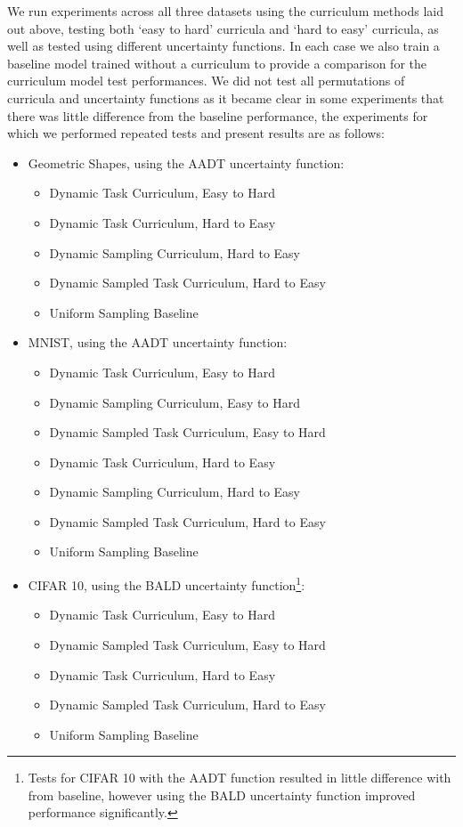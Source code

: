 We run experiments across all three datasets using the curriculum methods laid out above, testing both `easy to hard' curricula and `hard to easy' curricula, as well as tested using different uncertainty functions. In each case we also train a baseline model trained without a curriculum to provide a comparison for the curriculum model test performances. We did not test all permutations of curricula and uncertainty functions as it became clear in some experiments that there was little difference from the baseline performance, the experiments for which we performed repeated tests and present results are as follows:
\begin{itemize}
\item Geometric Shapes, using the AADT uncertainty function:
\begin{itemize}
\item{Dynamic Task Curriculum, Easy to Hard}
\item{Dynamic Task Curriculum, Hard to Easy}
\item{Dynamic Sampling Curriculum, Hard to Easy}
\item{Dynamic Sampled Task Curriculum, Hard to Easy}
\item{Uniform Sampling Baseline}
\end{itemize}
\item MNIST, using the AADT uncertainty function:
\begin{itemize}
\item{Dynamic Task Curriculum, Easy to Hard}
\item{Dynamic Sampling Curriculum, Easy to Hard}
\item{Dynamic Sampled Task Curriculum, Easy to Hard}
\item{Dynamic Task Curriculum, Hard to Easy}
\item{Dynamic Sampling Curriculum, Hard to Easy}
\item{Dynamic Sampled Task Curriculum, Hard to Easy}
\item{Uniform Sampling Baseline}
\end{itemize}
\item CIFAR 10, using the BALD uncertainty function\footnote {Tests for CIFAR 10 with the AADT function resulted in little difference with from baseline, however using the BALD uncertainty function improved performance significantly.}:
\begin{itemize}
\item{Dynamic Task Curriculum, Easy to Hard}
\item{Dynamic Sampled Task Curriculum, Easy to Hard}
\item{Dynamic Task Curriculum, Hard to Easy}
\item{Dynamic Sampled Task Curriculum, Hard to Easy}
\item{Uniform Sampling Baseline}
\end{itemize}
\end{itemize}
